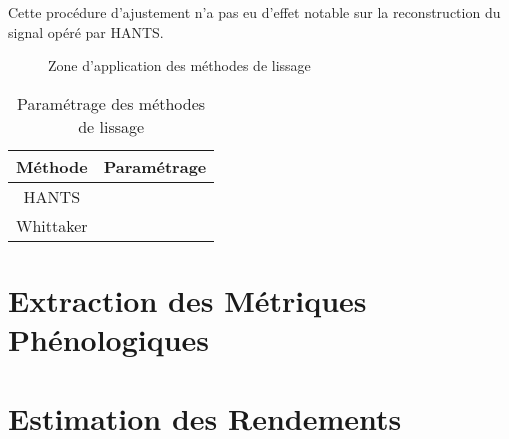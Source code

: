 \vspace{5mm}

Cette procédure d'ajustement n'a pas eu d'effet notable sur la reconstruction du signal opéré par HANTS. 

\begin{figure}[htbp]
 \begin{center}
 \end{center}
 \caption{Zone d'application des méthodes de lissage}
 \label{carte-lissage}
\end{figure}

\begin{table}[htbp]
\begin{center}
\caption{Paramétrage des méthodes de lissage}
\label{param-hants-whit}
 \begin{tabular}{cc}
  \hline
  Méthode & Paramétrage\\
  \hline
  HANTS & \\
  Whittaker & \\
  \hline
 \end{tabular}
\end{center}
\end{table}



\section{Extraction des Métriques Phénologiques}

\section{Estimation des Rendements}

